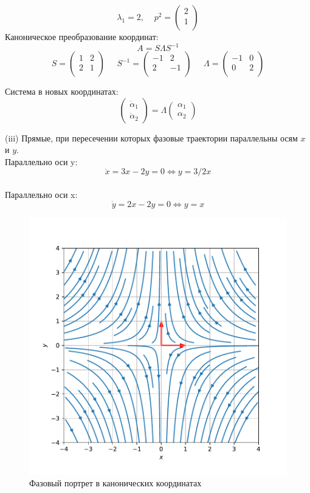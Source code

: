 \documentclass[a4paper, 12pt]{article}
\begin{document}
\[\lambda_1=2,\;\;\;\; p^2=
\left(
\begin{array}{cc}
2\\
1\\
\end{array}
\right)
\]
Каноническое преобразование координат:
\[A = S\Lambda S^{-1}\]
\[
S = \left(
\begin{array}{cc}
1 & 2\\
2 & 1\\
\end{array}
\right)\;\;\;\;\;
S^{-1} = \left(
\begin{array}{cc}
-1 & 2\\
2 & -1\\
\end{array}\right)\;\;\;\;\;
\Lambda = \left(
\begin{array}{cc}
-1 & 0\\
0 & 2\\
\end{array}\right)
\]

Система в новых координатах:
\[\left(
\begin{array}{c}
\dot{\alpha}_1\\
\dot{\alpha}_2
\end{array}
\right)=\Lambda\left(
\begin{array}{c}
{\alpha}_1 \\
{\alpha}_2
\end{array}
\right)\]


(iii) Прямые, при пересечении которых фазовые траектории параллельны осям $x$ и $y$.\\
Параллельно оси y:
\[\dot{x} = 3x-2y=0\Leftrightarrow y = 3/2x\]\\
Параллельно оси x:
\[\dot{y} = 2x-2y=0\Leftrightarrow y = x\]
\begin{figure}[H]
	\centering
	\includegraphics[scale=0.7]{1a1_0}
	\caption{Фазовый портрет в канонических координатах}
	\label{im:1a1_0}
\end{figure}
\end{document}
